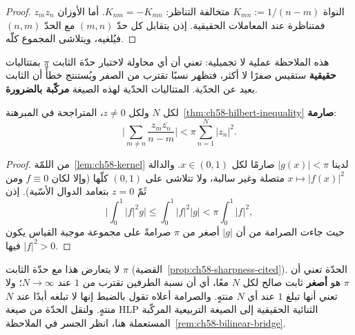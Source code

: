 \begin{proof}
النواة \(K_{mn}:=1/(n-m)\) متخالفة التناظر: \(K_{nm}=-K_{mn}\). أما
الأوزان \(z_mz_n\) فمتناظرة عند المعاملات الحقيقية. إذن يتقابل كل حدّ
\((m,n)\) مع الحدّ \((n,m)\) فيُلغيه، ويتلاشى المجموع كلّه.
\end{proof}

\begin{remark}
\label{rem:ch58-real-vanishing-consequence}
هذه الملاحظة عملية لا تجميلية: تعني أن أي محاولة لاختبار حدّة الثابت
\(\pi\) بمتتاليات \textbf{حقيقية} ستقيس صفرًا لا أكثر، فتظهر نسبًا تقترب
من الصفر ويُستنتج خطأً أن الثابت بعيد عن الحدّية. المتتاليات الحدّية
لهذه الصيغة \textbf{مركّبة بالضرورة}.
\end{remark}

\begin{proposition}
\label{prop:ch58-strictness}
\provedhere
لكل \(N\) ولكل \(z\ne0\)، المتراجحة في
المبرهنة~\ref{thm:ch58-hilbert-inequality} \textbf{صارمة}:
\[
\Biggl\lvert\sum_{m\ne n}\frac{z_m\overline{z_n}}{n-m}\Biggr\rvert
<\pi\sum_{n=1}^{N}\lvert z_n\rvert^2.
\]
\end{proposition}

\begin{proof}
من اللمّة~\ref{lem:ch58-kernel} لدينا \(\lvert g(x)\rvert<\pi\) صارمًا
لكل \(x\in(0,1)\). والدالة \(x\mapsto\lvert f(x)\rvert^2\) متصلة وغير
سالبة، ولا تتلاشى على \((0,1)\) كلّها (وإلا لكان \(f\equiv0\) ومن ثَمّ
\(z=0\) بتعامد الدوال الأسّية). إذن
\[
\Biggl\lvert\int_0^1\lvert f\rvert^2g\Biggr\rvert
\le\int_0^1\lvert f\rvert^2\lvert g\rvert
<\pi\int_0^1\lvert f\rvert^2,
\]
حيث جاءت الصرامة من أن \(\lvert g\rvert\) أصغر من \(\pi\) صرامةً على
مجموعة موجبة القياس يكون فيها \(\lvert f\rvert^2>0\).
\end{proof}

\begin{remark}
\label{rem:ch58-strictness-vs-sharpness}
لا يتعارض هذا مع حدّة الثابت \(\pi\)
(القضية~\ref{prop:ch58-sharpness-cited}). الحدّة تعني أن \(\pi\) هو
\textbf{أصغر} ثابت صالح لكل \(N\) معًا، أي أن نسبة الطرفين تقترب من
\(1\) عند \(N\to\infty\)؛ ولا تعني أنها تبلغ \(1\) عند أي \(N\) منتهٍ.
والصرامة أعلاه تقول بالضبط إنها لا تبلغه أبدًا عند \(N\) منتهٍ. ولنقل
الحدّة من صيغة \textenglish{HLP} الثنائية الحقيقية إلى الصيغة التربيعية
المركّبة المستعملة هنا، انظر الجسر في
الملاحظة~\ref{rem:ch58-bilinear-bridge}.
\end{remark}

